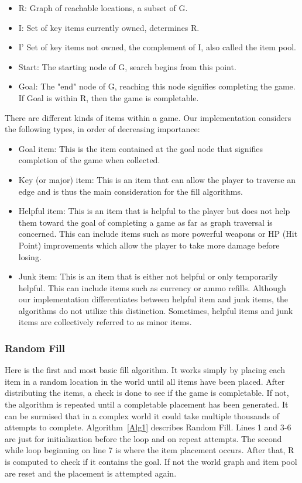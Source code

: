 \documentclass{ieeeaccess}
\begin{document}
\begin{itemize}
    \item R: Graph of reachable locations, a subset of G.
    \item I: Set of key items currently owned, determines R.
    \item I' Set of key items not owned, the complement of I, also called the
    item pool.
    \item Start: The starting node of G, search begins from this point.
    \item Goal: The "end" node of G, reaching this node signifies completing the game. If Goal
    is within R, then the game is completable.
\end{itemize}

There are different kinds of items within a game. Our implementation considers the following
types, in order of decreasing importance:

\begin{itemize}
    \item Goal item: This is the item contained at the goal node that signifies completion of
    the game when collected.
    \item Key (or major) item: This is an item that can allow the player to traverse an edge and
    is thus the main consideration for the fill algorithms.
    \item Helpful item: This is an item that is helpful to the player but does not help them
    toward the goal of completing a game as far as graph traversal is concerned. This can
    include items such as more powerful weapons or HP (Hit Point) improvements which allow 
    the player to take more damage before losing.
    \item Junk item: This is an item that is either not helpful or only temporarily helpful.
    This can include items such as currency or ammo refills. Although our implementation
    differentiates between helpful item and junk items, the algorithms do not utilize this
    distinction. Sometimes, helpful items and junk items are collectively referred to as minor
    items.
\end{itemize}

\subsubsection{Random Fill}
Here is the first and most basic fill algorithm. It works simply by placing each item in a
random location in the world until all items have been placed. After distributing the items, a
check is done to see if the game is completable. If not, the algorithm is repeated until a
completable placement has been generated. It can be surmised that in a complex world it could
take multiple thousands of attempts to complete. Algorithm~\ref{Alg1} describes Random Fill. 
Lines 1 and 3-6 are just for initialization before the loop and on repeat attempts. 
The second while loop beginning on line 7 is where the item placement occurs. 
After that, R is computed to check if it contains the goal. If not the world graph and item 
pool are reset and the placement is attempted again.
\end{document}
